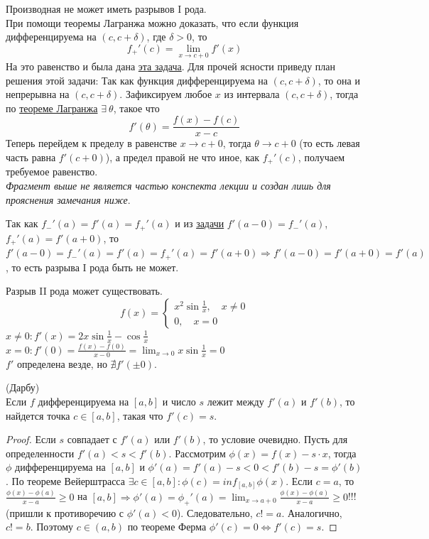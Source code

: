 \begin{note}
    Производная не может иметь разрывов I рода.\\
    При помощи теоремы Лагранжа можно доказать, что если функция дифференцируема на $(c, c+\delta)$, где $\delta > 0$, то 
    \[f_+'(c) = \lim_{x \to c+0} f'(x)\]
    На это равенство и была дана \hyperlink{task1}{эта задача}.
    Для прочей ясности приведу план решения этой задачи: Так как функция дифференцируема на $(c, c+\delta)$, то она и непрерывна на $(c, c+\delta)$.
    Зафиксируем любое $x$ из интервала $(c, c+\delta)$, тогда по \hyperlink{lagrange}{теореме Лагранжа} $\exists \ \theta$, такое что \[f'(\theta) = \frac{f(x)-f(c)}{x-c}\]
    Теперь перейдем к пределу в равенстве $x \to c+0$, тогда $\theta \to c+0$ (то есть левая часть равна $f'(c+0)$), а предел правой не что иное, как $f_+'(c)$, получаем требуемое равенство.\\
    \textit{Фрагмент выше не является частью конспекта лекции и создан лишь для прояснения замечания ниже}.

    Так как $f_-'(a) = f'(a) = f_+'(a)$ и из \hyperlink{task1}{задачи} $f'(a-0) = f_-'(a)$, $f_+'(a) = f'(a+0)$, то $f'(a-0) = f_-'(a) = f'(a) = f_+'(a) = f'(a+0) \Rightarrow f'(a-0) = f'(a+0) = f'(a)$, то есть разрыва I рода быть не может.
\end{note}

\begin{example}
    Разрыв II рода может существовать.\\
    \[f(x) = \begin{cases}
        x^2\sin\frac{1}{x}, \quad x \neq 0\\
        0, \quad x = 0
    \end{cases}\]
    $x \neq 0: f'(x) = 2x\sin\frac{1}{x}-\cos\frac{1}{x}$\\
    $x = 0: f'(0) = \frac{f(x)-f(0)}{x-0} = \lim_{x \to 0} x\sin{\frac{1}{x}} = 0$\\
    $f'$ определена везде, но $\nexists f'(\pm 0)$.
\end{example}

\begin{theorem}
    (Дарбу)\\
    Если $f$ дифференцируема на $[a, b]$ и число $s$ лежит между $f'(a)$ и $f'(b)$,
    то найдется точка $c \in [a, b]$, такая что $f'(c) = s$.
\end{theorem}

\begin{proof}
    Если $s$ совпадает с $f'(a)$ или $f'(b)$, то условие очевидно.
    Пусть для определенности $f'(a) < s < f'(b)$.
    Рассмотрим $\phi(x) = f(x) - s \cdot x$, тогда $\phi$ дифференцируема на $[a, b]$
    и $\phi'(a) = f'(a) - s < 0 < f'(b) - s = \phi'(b)$.
    По теореме Вейерштрасса $\exists c \in [a, b] : \phi(c) = inf_{[a, b]}\phi(x)$. Если $c = a$, то
    $\frac{\phi(x)-\phi(a)}{x-a} \geq 0$ на $[a, b] \Rightarrow \phi'(a) = \phi_+'(a) = \lim_{x \to a+0} \frac{\phi(x)-\phi(a)}{x-a} \geq 0$!!! (пришли к противоречию с $\phi'(a) < 0$).
    Следовательно, $c != a$. Аналогично, $c != b$. Поэтому $c \in (a, b)$ по теореме Ферма $\phi'(c) = 0 \iff f'(c) = s$.
\end{proof}


